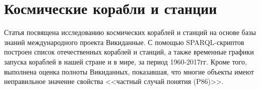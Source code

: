 \chapter{Космические корабли и станции}
\label{ch:spacecraft-space-station}

Статья посвящена исследованию космических кораблей и станций на основе базы знаний международного проекта Викиданные. С помощью SPARQL-скриптов построен список отечественных кораблей и станций, а также временные графики запуска кораблей в нашей стране и в мире, за период 1960-2017гг. Кроме того, выполнена оценка полноты Викиданных, показавшая, что многие объекты имеют неправильное значение свойства <<частный случай понятия (P86)>>.
